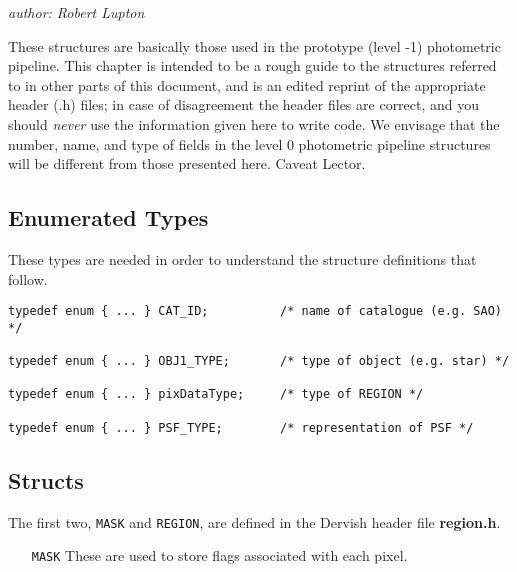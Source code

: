 
\medskip
\centerline {\it author: Robert Lupton}
\medskip

%
{\hfuzz=85pt			%

These structures are basically those used in the prototype (level -1)
photometric pipeline. This chapter is intended to be a rough guide to
the structures referred to in other parts of this document, and is an
edited reprint of the appropriate header (.h) files; in case of disagreement
the header files are correct, and you should {\em never} use the information
given here to write code. We envisage that the number, name, and type
of fields in the level 0 photometric pipeline structures will be different
from those presented here. Caveat Lector.

\subsection{Enumerated Types}

These types are needed in order to understand the structure definitions
that follow.

\begin{verbatim}
typedef enum { ... } CAT_ID;          /* name of catalogue (e.g. SAO) */

typedef enum { ... } OBJ1_TYPE;       /* type of object (e.g. star) */

typedef enum { ... } pixDataType;     /* type of REGION */

typedef enum { ... } PSF_TYPE;        /* representation of PSF */
\end{verbatim}

\subsection{Structs}

The first two, {\tt MASK} and {\tt REGION}, are defined in the Dervish
header file {\bf region.h}.

\begin{itemize}
\item[{\tt MASK}]
These are used to store flags associated with each pixel.


\end{itemize}}
